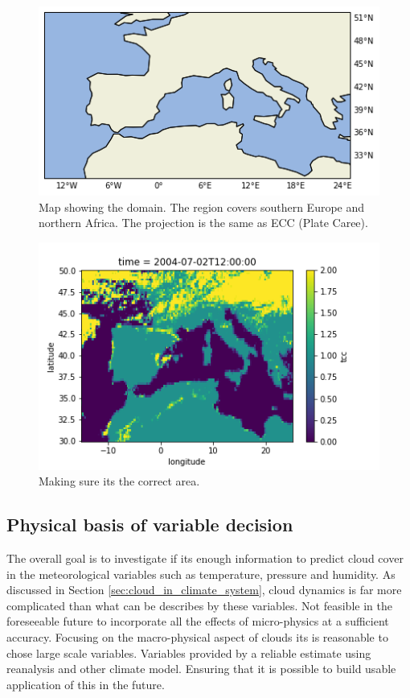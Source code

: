 \begin{figure}[h]
    \centering
    \includegraphics[scale = 0.7]{Chapter4_Results/figurs/Domain.png}
    \caption[Map over domain.]{Map showing the domain. The region covers southern Europe and northern Africa. The projection is the same as ECC (Plate Caree).}
    \label{fig:map}
\end{figure}

\begin{figure}
    \centering
    \includegraphics{Chapter4_Results/figurs/regridded_raw_satelite_image_to_make_sure_its_correcxt_area.png}
    \caption{Making sure its the correct area.}
    \label{fig:correct_area}
\end{figure}

\subsection{Physical basis of variable decision} \label{sec:ecc}
The overall goal is to investigate if its enough information to predict cloud cover in the meteorological variables such as temperature, pressure and humidity. As discussed in Section \ref{sec:cloud_in_climate_system}, cloud dynamics is far more complicated than what can be describes by these variables. Not feasible in the foreseeable future to incorporate all the effects of micro-physics at a sufficient accuracy. Focusing on the macro-physical aspect of clouds its is reasonable to chose large scale variables.  Variables provided by a reliable estimate using reanalysis and other climate model. Ensuring that it is possible to build usable application of this in the future.

